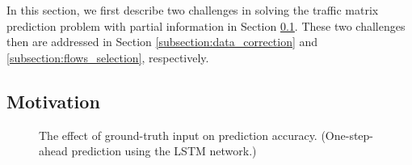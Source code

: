 In this section, we first describe two challenges in solving the traffic matrix prediction problem with partial information in Section \ref{subsection:motivation}. 
These two challenges then are addressed in Section \ref{subsection:data_correction} and \ref{subsection:flows_selection}, respectively.
\subsection{Motivation}
\label{subsection:motivation}
\begin{figure}
\caption{The effect of ground-truth input on prediction accuracy. (One-step-ahead prediction using the LSTM network.)}
\label{fig:effect_ground_truth_input}
\vspace{-5pt}
\end{figure}
